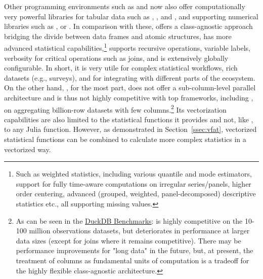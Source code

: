 \documentclass[article]{jss}
\begin{document}
Other programming environments such as  and  now also offer computationally very powerful libraries for tabular data such as  \citep{jldataframes},  \citep{pypolars}, and  \citep{mckinney2010pandas, pypandas}, and supporting numerical libraries such as  \citep{pynumpy}, or  \citep{jlstatsbase}. %
In comparison with these,  offers a class-agnostic approach bridging the divide between data frames and atomic structures, has more advanced statistical capabilities,\footnote{Such as weighted statistics, including various quantile and mode estimators, support for fully time-aware computations on irregular series/panels, higher order centering, advanced (grouped, weighted, panel-decomposed) descriptive statistics etc., all supporting missing values.} supports recursive operations, variable labels, verbosity for critical operations such as joins, and is extensively globally configurable. In short, it is very utile for complex statistical workflows, rich datasets (e.g., surveys), and for integrating with different parts of the  ecosystem. On the other hand, , for the most part, does not offer a sub-column-level parallel architecture and is thus not highly competitive with top frameworks, including , on aggregating billion-row datasets with few columns.\footnote{As can be seen in the \href{https://duckdblabs.github.io/db-benchmark/}{DuckDB Benchmarks}:  is highly competitive on the 10-100 million observations datasets, but deteriorates in performance at larger data sizes (except for joins where it remains competitive). There may be performance improvements for "long data" in the future, but, at present, the treatment of columns as fundamental units of computation is a tradeoff for the highly flexible class-agnostic architecture.} Its vectorization capabilities are also limited to the statistical functions it provides and not, like , to any Julia function. However, as demonstrated in Section~\ref{ssec:vfat}, vectorized statistical functions can be combined to calculate more complex statistics in a vectorized way. \newline
\end{document}
